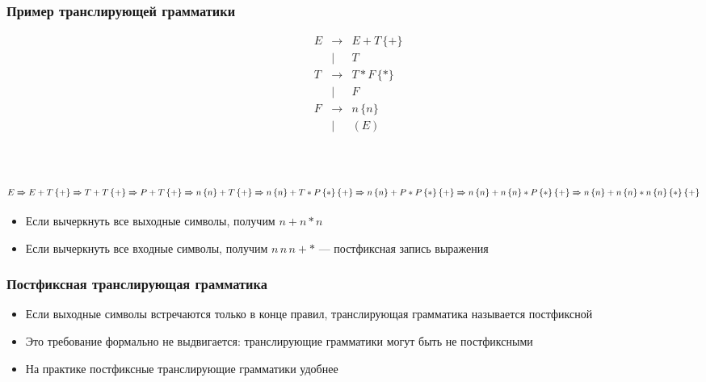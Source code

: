 \documentclass{beamer}
\newcommand{\derives}[0]{\xRightarrow[]{}}
\begin{document}
\begin{frame}[fragile]
  \transwipe[direction=90]
  \frametitle{Пример транслирующей грамматики}
$$
\begin{array}{cccl}
&E& \rightarrow & E + T \, \{+\} \\
& &    |        & T   \\
&T& \rightarrow & T * F \, \{*\} \\
& &    |        & F  \\
&F& \rightarrow & n \, \{n\} \\
& &    |        & ( E ) \\
\end{array}
$$
\pause ~\\~

$E \derives E + T \, \{ + \} \derives T + T \, \{ + \} \derives P + T \, \{ + \} \derives n \, \{ n \} + T \, \{ + \} \derives n \, \{ n \} + T * P \, \{ * \} \, \{ + \} \derives n \, \{ n \} + P * P \, \{ * \} \, \{ + \} \derives n \, \{ n \} +  n \, \{ n \} * P \, \{ * \} \, \{ + \} \derives n \, \{ n \} +  n \, \{ n \} * n \, \{ n \} \, \{ * \} \, \{ + \}$

\pause
\begin{itemize}
  \item Если вычеркнуть все выходные символы, получим $n + n * n$
  \item Если вычеркнуть все входные символы, получим $n \, n \, n + *$ --- постфиксная запись выражения
\end{itemize}
\end{frame}


\begin{frame}[fragile]
  \transwipe[direction=90]
  \frametitle{Постфиксная транслирующая грамматика}
  \begin{itemize}
    \item Если выходные символы встречаются только в конце правил, транслирующая грамматика называется постфиксной
    \item Это требование формально не выдвигается: транслирующие грамматики могут быть не постфиксными
    \item На практике постфиксные транслирующие грамматики удобнее
  \end{itemize}
\end{frame}
\end{document}
